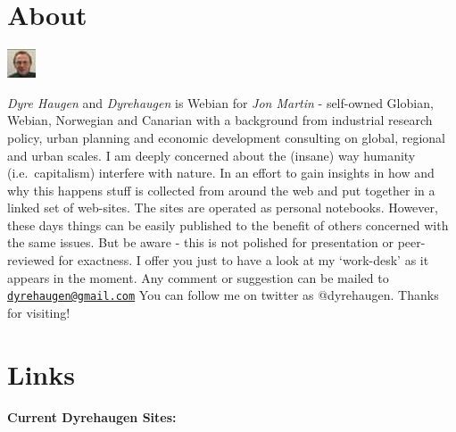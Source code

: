 \documentclass[
]{book}
\begin{document}
\hypertarget{about}{%
\chapter{About}\label{about}}

\includegraphics{fig/me.jpg}

\emph{Dyre Haugen} and \emph{Dyrehaugen} is Webian for \emph{Jon Martin} -
self-owned Globian, Webian, Norwegian and Canarian with
a background from industrial research policy, urban planning and
economic development consulting on global, regional and urban scales.
I am deeply concerned about the (insane) way
humanity (i.e.~capitalism) interfere with nature.
In an effort to gain insights in how and why this happens
stuff is collected from around the web and put together
in a linked set of web-sites.
The sites are operated as personal notebooks.
However, these days things can be easily published to the
benefit of others concerned with the same issues.
But be aware - this is not polished for presentation or
peer-reviewed for exactness.
I offer you just to have a look at my `work-desk' as it appears in the moment.
Any comment or suggestion can be mailed to \href{mailto:dyrehaugen@gmail.com}{\nolinkurl{dyrehaugen@gmail.com}}
You can follow me on twitter as @dyrehaugen.
Thanks for visiting!

\hypertarget{links}{%
\chapter{Links}\label{links}}

\textbf{Current Dyrehaugen Sites:}
\end{document}
